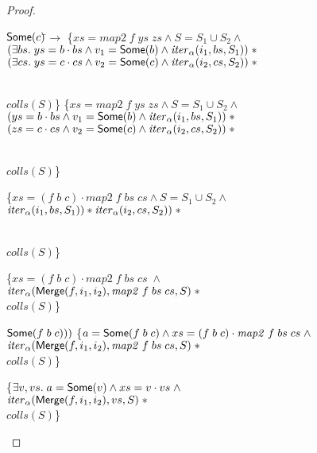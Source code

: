 \begin{proof}
\begin{itemize}
\begin{specification}
\nextline \> \;\;\; $\mathsf{Some}(c)$\=$ \to $ 
\nextline \> \> \{$xs = \mathit{map2}\;f\;ys\;zs \land 
                  S = S_1 \cup S_2 \land$ 
\\ \> \> \>\;\;    $(\exists bs.\; ys = b\cdot bs \land v_1 = \mathsf{Some}(b) \land 
                                \mathit{iter}_\alpha(i_1, bs, S_1)) \;*$
\\ \> \> \>\;\;    $(\exists cs.\; ys = c\cdot cs \land v_2 = \mathsf{Some}(c) \land 
                                \mathit{iter}_\alpha(i_2, cs, S_2)) \;*$

\\ \> \> \>\;     $\mathit{colls}(S)$\}
\nextline \> \> \{$xs = \mathit{map2}\;f\;ys\;zs \land 
                  S = S_1 \cup S_2 \land$ 
\\ \> \> \>\;    $(ys = b\cdot bs \land v_1 = \mathsf{Some}(b) \land 
                                \mathit{iter}_\alpha(i_1, bs, S_1)) \;*$
\\ \> \> \>\;    $(zs = c\cdot cs \land v_2 = \mathsf{Some}(c) \land 
                                \mathit{iter}_\alpha(i_2, cs, S_2)) \;*$

\\ \> \> \>\;     $\mathit{colls}(S)$\}

\nextline \> \> \{$xs = (f\;b\;c) \cdot \mathit{map2}\;f\;bs\;cs \land 
                  S = S_1 \cup S_2 \land$ 
\\ \> \> \>\;    $\mathit{iter}_\alpha(i_1, bs, S_1)) * \mathit{iter}_\alpha(i_2, cs, S_2)) \;*$

\\ \> \> \>\;     $\mathit{colls}(S)$\}

\nextline \> \> \{$xs = (f\;b\;c) \cdot \mathit{map2}\;f\;bs\;cs \; \land$
\\ \> \> \>\;    $\mathit{iter}_\alpha(\mathsf{Merge}(f, i_1, i_2), \mathit{map2}\;f\;bs\;cs, S) \;*$
\\ \> \> \>\;     $\mathit{colls}(S)$\}

\nextline \> \> $\mathsf{Some}(f\;b\;c)))$ 
\nextline \> \> \{$a = \mathsf{Some}(f\;b\;c) \land xs = (f\;b\;c) \cdot \mathit{map2}\;f\;bs\;cs \; \land$
\\ \> \> \>\;    $\mathit{iter}_\alpha(\mathsf{Merge}(f, i_1, i_2), \mathit{map2}\;f\;bs\;cs, S) \;*$
\\ \> \> \>\;     $\mathit{colls}(S)$\}

\nextline \> \> \{$\exists v, vs.\; a = \mathsf{Some}(v) \land xs = v \cdot vs \; \land$
\\ \> \> \>\;    $\mathit{iter}_\alpha(\mathsf{Merge}(f, i_1, i_2), vs, S) \;*$
\\ \> \> \>\;     $\mathit{colls}(S)$\}


\end{specification}

\end{itemize}

\end{proof}


